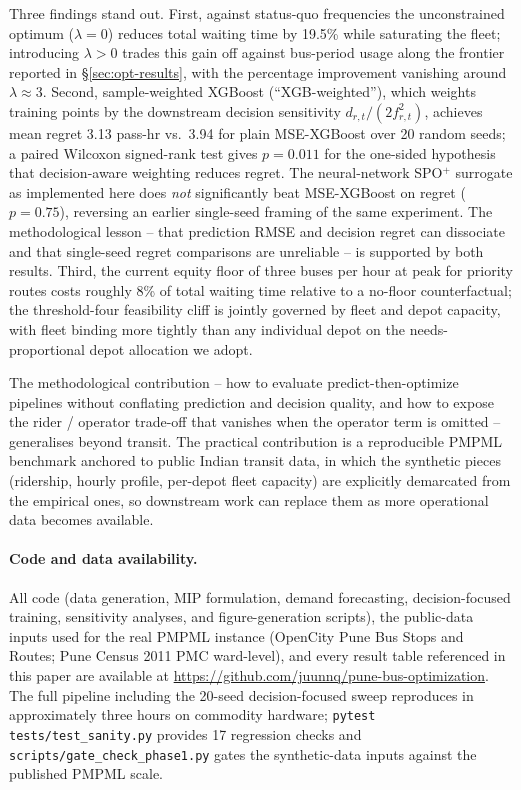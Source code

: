 \documentclass[a4paper,twoside]{article}
\begin{document}
Three findings stand out. First, against status-quo frequencies
the unconstrained optimum (\(\lambda = 0\)) reduces total
waiting time by 19.5\% while saturating the fleet; introducing
$\lambda > 0$ trades this gain off against bus-period usage along
the frontier reported in \S\ref{sec:opt-results}, with the
percentage improvement vanishing around $\lambda \approx 3$.
Second, sample-weighted XGBoost (``XGB-weighted''), which weights
training points by the downstream decision sensitivity
$d_{r,t}/(2 f_{r,t}^2)$, achieves mean regret 3.13 pass-hr vs.\
3.94 for plain MSE-XGBoost over 20 random seeds; a paired
Wilcoxon signed-rank test gives $p = 0.011$ for the one-sided
hypothesis that decision-aware weighting reduces regret. The
neural-network SPO$^+$ surrogate as implemented here does
\emph{not} significantly beat MSE-XGBoost on regret
($p = 0.75$), reversing an earlier single-seed framing of the
same experiment. The methodological lesson -- that prediction
RMSE and decision regret can dissociate and that single-seed
regret comparisons are unreliable -- is supported by both
results. Third,
the current equity floor of three buses per hour at peak for
priority routes costs roughly 8\% of total waiting time relative
to a no-floor counterfactual; the threshold-four feasibility
cliff is jointly governed by fleet and depot capacity, with
fleet binding more tightly than any individual depot on the
needs-proportional depot allocation we adopt.

The methodological contribution -- how to evaluate
predict-then-optimize pipelines without conflating prediction and
decision quality, and how to expose the rider / operator
trade-off that vanishes when the operator term is omitted --
generalises beyond transit. The practical contribution is a
reproducible PMPML benchmark anchored to public Indian transit
data, in which the synthetic pieces (ridership, hourly profile,
per-depot fleet capacity) are explicitly demarcated from the
empirical ones, so downstream work can replace them as more
operational data becomes available.

\paragraph{Code and data availability.}
All code (data generation, MIP formulation, demand forecasting,
decision-focused training, sensitivity analyses, and figure-generation
scripts), the public-data inputs used for the real PMPML instance
(OpenCity Pune Bus Stops and Routes; Pune Census 2011 PMC ward-level),
and every result table referenced in this paper are available at
\url{https://github.com/juunnq/pune-bus-optimization}. The full pipeline
including the 20-seed decision-focused sweep reproduces in approximately
three hours on commodity hardware; \texttt{pytest tests/test\_sanity.py}
provides 17 regression checks and \texttt{scripts/gate\_check\_phase1.py}
gates the synthetic-data inputs against the published PMPML scale.


{\small
}
\end{document}
